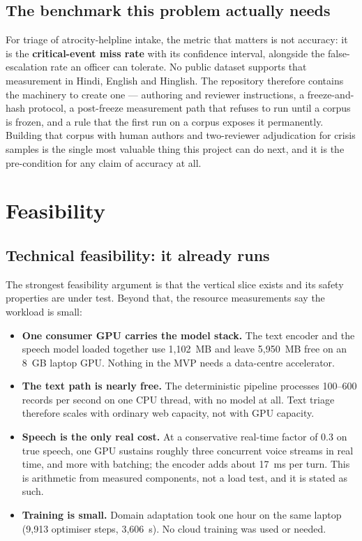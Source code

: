 \documentclass[11pt,a4paper]{article}
\begin{document}
\subsection{The benchmark this problem actually needs}
\label{sec:buildbench}
For triage of atrocity-helpline intake, the metric that matters is not accuracy: it is the
\textbf{critical-event miss rate} with its confidence interval, alongside the false-escalation rate
an officer can tolerate. No public dataset supports that measurement in Hindi, English and Hinglish.
The repository therefore contains the machinery to create one --- authoring and reviewer
instructions, a freeze-and-hash protocol, a post-freeze measurement path that refuses to run until a
corpus is frozen, and a rule that the first run on a corpus exposes it permanently. Building that
corpus with human authors and two-reviewer adjudication for crisis samples is the single most
valuable thing this project can do next, and it is the pre-condition for any claim of accuracy at all.
\section{Feasibility}
\label{sec:feasibility}

\subsection{Technical feasibility: it already runs}
The strongest feasibility argument is that the vertical slice exists and its safety properties are
under test. Beyond that, the resource measurements say the workload is small:

\begin{itemize}
  \item \textbf{One consumer GPU carries the model stack.} The text encoder and the speech model
        loaded together use 1{,}102~MB and leave 5{,}950~MB free on an 8~GB laptop GPU. Nothing in
        the MVP needs a data-centre accelerator.
  \item \textbf{The text path is nearly free.} The deterministic pipeline processes 100--600 records
        per second on one CPU thread, with no model at all. Text triage therefore scales with
        ordinary web capacity, not with GPU capacity.
  \item \textbf{Speech is the only real cost.} At a conservative real-time factor of 0.3 on true
        speech, one GPU sustains roughly three concurrent voice streams in real time, and more with
        batching; the encoder adds about 17~ms per turn. This is arithmetic from measured components,
        not a load test, and it is stated as such.
  \item \textbf{Training is small.} Domain adaptation took one hour on the same laptop
        (9{,}913 optimiser steps, 3{,}606~s). No cloud training was used or needed.
\end{itemize}
\end{document}
